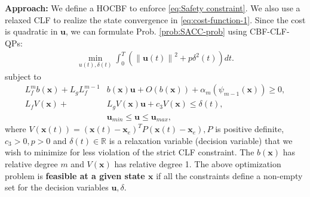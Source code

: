 \documentclass[letterpaper, 10 pt, conference]{ieeeconf}
\theoremstyle{definition}
\begin{document}
\textbf{Approach:} We define a HOCBF to enforce \eqref{eq:Safety constraint}.  We also use a relaxed CLF to realize the state convergence in \eqref{eq:cost-function-1}. Since the cost is quadratic in $\boldsymbol{u}$, we can formulate Prob. \ref{prob:SACC-prob} using CBF-CLF-QPs:
\begin{equation}
\label{eq:optimal control-cost}
\begin{split}
\min_{u(t),\delta(t)} \int_{0}^{T}(\left \| \boldsymbol{u}(t) \right \| ^{2}+p\delta^{2}(t))dt.
\end{split}
\end{equation}
subject to
\begin{subequations}
\label{eq:hard constraints}
\begin{align}
L_{f}^{m}b(\boldsymbol{x})+L_{g}L_{f}^{m-1}&b(\boldsymbol{x})\boldsymbol{u}+O(b(\boldsymbol{x}))
+\alpha_{m}(\psi_{m-1}(\boldsymbol{x}))\ge 0,\label{subeq:HOCBF as 1}\\ 
L_{f}V(\boldsymbol{x})+&L_{g}V(\boldsymbol{x})\boldsymbol{u}+c_{3}V(\boldsymbol{x})\le \delta(t),\label{subeq:CLF as 2}\\
&\boldsymbol{u}_{min}\le \boldsymbol{u} \le \boldsymbol{u}_{max},\label{subeq:control bounds as 3}
\end{align}
\end{subequations}
where $V(\boldsymbol{x}(t))=(\boldsymbol{x}(t)-\boldsymbol{x}_{e})^{T}P(\boldsymbol{x}(t)-\boldsymbol{x}_{e}), P$ is positive definite, $c_{3}>0, p>0$ and $\delta(t) \in \mathbb{R}$ is a relaxation variable (decision variable) that we wish to minimize for less violation of the strict CLF constraint. The $b(\boldsymbol{x})$ has relative degree $m$ and $V(\boldsymbol{x})$ has relative degree 1. The above optimization problem is \textbf{ feasible at a given state $\boldsymbol{x}$} if all the constraints define a non-empty set for the decision variables $\boldsymbol{u},\delta.$
\end{document}
